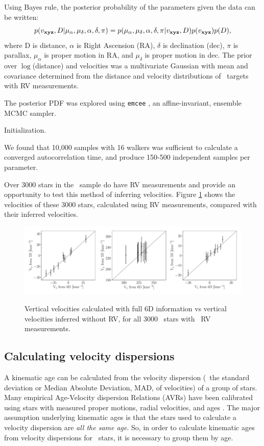 Using Bayes rule, the posterior probability of the parameters given the data
can be written:
\begin{equation}
p(v_{\bf xyz}, D | \mu_{\alpha}, \mu_{\delta}, \alpha, \delta, \pi) =
    p(\mu_{\alpha}, \mu_{\delta}, \alpha, \delta, \pi | v_{\bf xyz}, D)
    p(v_{\bf xyz}) p(D),
\end{equation}
where D is distance, $\alpha$ is Right Ascension (RA), $\delta$ is declination
(dec), $\pi$ is parallax, $\mu_\alpha$ is proper motion in RA, and
$\mu_\delta$ is proper motion in dec.
The prior over $\log$(distance) and velocities was a multivariate Gaussian
with mean and covariance determined from the distance and velocity
distributions of \kepler\ targets with RV measurements.

The posterior PDF was explored using {\tt emcee} \citep{forman-mackey2013}, an
affine-invariant, ensemble MCMC sampler.

Initialization.

We found that 10,000 samples with 16 walkers was sufficient to calculate a
converged autocorrelation time, and produce 150-500 independent samples per
parameter.

Over 3000 stars in the \mct\ sample do have RV measurements and provide an
opportunity to test this method of inferring velocities.
Figure \ref{fig:v_comparison} shows the velocities of these 3000 stars,
calculated using RV measurements, compared with their inferred velocities.

\begin{figure}[ht!]
\caption{Vertical velocities calculated with full 6D information vs vertical
    velocities inferred without RV, for all 3000 \mct\ stars with \gaia\ RV
    measurements.}
  \centering
    \includegraphics[width=1\textwidth]{v_comparison}
\label{fig:v_comparison}
\end{figure}

\subsection{Calculating velocity dispersions}
A kinematic age can be calculated from the velocity dispersion (\eg\ the
standard deviation or Median Absolute Deviation, MAD, of velocities) of a
group of stars.
Many empirical Age-Velocity dispersion Relations (AVRs) have been calibrated
using stars with measured proper motions, radial velocities, and ages
\citep[\eg][]{holberg2009, yu2019}.
The major assumption underlying kinematic ages is that the stars used to
calculate a velocity dispersion are {\it all the same age}.
So, in order to calculate kinematic ages from velocity dispersions for
\kepler\ stars, it is necessary to group them by age.

